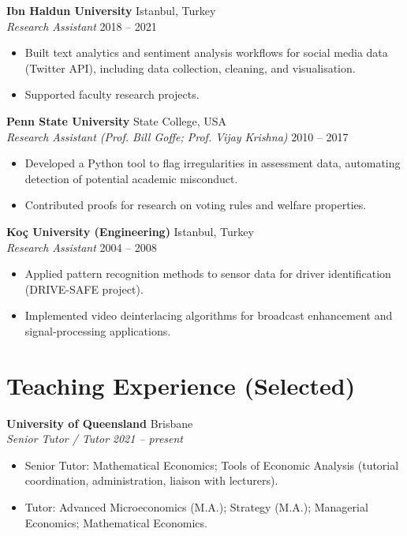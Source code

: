 \documentclass[11pt,a4paper]{article}
\newcommand{\entry}[4]{
    \noindent \textbf{#1} \hfill {\color{secondary}#2} \\
    \textit{#3} \hfill \textit{\color{secondary}#4}\vspace{1mm}
}
\begin{document}
\textbf{Ibn Haldun University} \hfill Istanbul, Turkey \\
\textit{Research Assistant} \hfill 2018 -- 2021
\begin{itemize}
    \item Built text analytics and sentiment analysis workflows for social media data (Twitter API), including data collection, cleaning, and visualisation.
    \item Supported faculty research projects.
\end{itemize}

\textbf{Penn State University} \hfill State College, USA \\
\textit{Research Assistant (Prof. Bill Goffe; Prof. Vijay Krishna)} \hfill 2010 -- 2017
\begin{itemize}
    \item Developed a Python tool to flag irregularities in assessment data, automating detection of potential academic misconduct.
    \item Contributed proofs for research on voting rules and welfare properties.
\end{itemize}

\textbf{Ko\c{c} University (Engineering)} \hfill Istanbul, Turkey \\
\textit{Research Assistant} \hfill 2004 -- 2008
\begin{itemize}
    \item Applied pattern recognition methods to sensor data for driver identification (DRIVE-SAFE project).
    \item Implemented video deinterlacing algorithms for broadcast enhancement and signal-processing applications.
\end{itemize}

\section{Teaching Experience (Selected)}

\entry{University of Queensland}{Brisbane}{Senior Tutor / Tutor}{2021 -- present}
\begin{itemize}
    \item Senior Tutor: Mathematical Economics; Tools of Economic Analysis (tutorial coordination, administration, liaison with lecturers).
    \item Tutor: Advanced Microeconomics (M.A.); Strategy (M.A.); Managerial Economics; Mathematical Economics.
\end{itemize}
\end{document}

